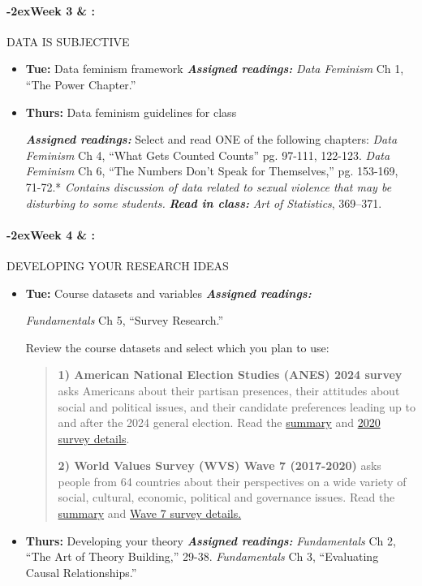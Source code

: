 \documentclass[11pt]{article}
\newcommand{\week}[1]{

  \paragraph*{\kern-2ex\quad #1 \AdvanceDate[1]\syldate{\today} \& \AdvanceDate[2]\syldate{\today} :}

  \ifdim\wd1=\wd\MONDAY
    \AdvanceDate[7]
  \else
    \AdvanceDate[7]
  \fi
}
\begin{document}
\week{Week 3} DATA IS SUBJECTIVE

\begin{itemize}
    \item [] \textbf{Tue:} Data feminism framework
        \subitem \textbf{\textit{ Assigned readings:}}
        \subsubitem \textit{Data Feminism} Ch 1, ``The Power Chapter.''

    \item [] \textbf{Thurs:} Data feminism guidelines for class

       \subitem \textbf{\textit{Assigned readings:}}
        \subsubitem Select and read ONE of the following chapters:
        \subsubitem \textit{Data Feminism} Ch 4, ``What Gets Counted Counts'' pg. 97-111, 122-123.
        \subsubitem \textit{Data Feminism} Ch 6, ``The Numbers Don't Speak for Themselves,'' pg. 153-169, 71-72.*\vspace{-5pt} \subsubitem \textit{\footnotesize*Contains discussion of data related to sexual violence that may be disturbing to some students.}
       \subitem \textbf{\textit{Read in class:}} \textit{Art of Statistics}, 369--371.
    \end{itemize}

\week{Week 4} DEVELOPING YOUR RESEARCH IDEAS
\begin{itemize}
    \item [] \textbf{Tue:} Course datasets and variables
        \subitem \textit{\textbf{Assigned readings:}}

        \subsubitem \textit{Fundamentals} Ch 5, ``Survey Research.''

        \subsubitem Review the course datasets and select which you plan to use:\vspace{-2pt}\begin{quotation}\noindent \textbf{1) American National Election Studies (ANES) 2024 survey} asks Americans about their partisan presences, their attitudes about social and political issues, and their candidate preferences leading up to and after the 2024 general election. Read the \href{https://electionstudies.org/about-us/}{summary} and \href{https://electionstudies.org/data-center/2020-time-series-study/}{2020 survey details}.

        \vspace{5pt}\noindent \textbf{2) World Values Survey (WVS) Wave 7 (2017-2020)} asks people from 64 countries about their perspectives on a wide variety of social, cultural, economic, political and governance issues. Read the \href{https://www.worldvaluessurvey.org/WVSContents.jsp}{summary} and \href{https://www.worldvaluessurvey.org/WVSContents.jsp}{Wave 7 survey details.}
        \end{quotation}
    \item [] \textbf{Thurs:} Developing your theory
        \subitem \textbf{\textit{Assigned readings:}}
        \subsubitem \textit{Fundamentals} Ch 2, ``The Art of Theory Building,'' 29-38.
        \subsubitem \textit{Fundamentals} Ch 3, ``Evaluating Causal Relationships.''
\end{itemize}
\end{document}
